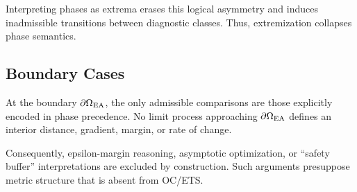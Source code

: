 Interpreting phases as extrema erases this logical asymmetry and induces
inadmissible transitions between diagnostic classes. Thus, extremization
collapses phase semantics.

\subsection{Boundary Cases}

At the boundary $\partial\Omega_{\mathrm{EA}}$, the only admissible comparisons are those
explicitly encoded in phase precedence. No limit process approaching
$\partial\Omega_{\mathrm{EA}}$ defines an interior distance, gradient, margin, or rate of
change.

Consequently, epsilon-margin reasoning, asymptotic optimization, or
``safety buffer'' interpretations are excluded by construction. Such
arguments presuppose metric structure that is absent from OC/ETS.


